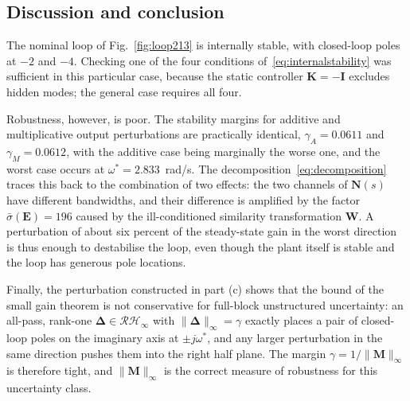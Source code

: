\subsection{Discussion and conclusion}

The nominal loop of Fig.~\ref{fig:loop213} is internally stable, with closed-loop poles at $-2$
and $-4$. Checking one of the four conditions of~\eqref{eq:internalstability} was sufficient in
this particular case, because the static controller $\mathbf{K}=-\mathbf{I}$ excludes hidden
modes; the general case requires all four.

Robustness, however, is poor. The stability margins for additive and multiplicative output
perturbations are practically identical, $\gamma_A=0.0611$ and $\gamma_M=0.0612$, with the
additive case being marginally the worse one, and the worst case occurs at
$\omega^*=2.833$~rad/s. The decomposition~\eqref{eq:decomposition} traces this back to the
combination of two effects: the two channels of $\mathbf{N}(s)$ have different bandwidths, and
their difference is amplified by the factor $\bar{\sigma}(\mathbf{E})=196$ caused by the
ill-conditioned similarity transformation $\mathbf{W}$. A perturbation of about six percent of
the steady-state gain in the worst direction is thus enough to destabilise the loop, even though
the plant itself is stable and the loop has generous pole locations.

Finally, the perturbation constructed in part (c) shows that the bound of the small gain theorem
is not conservative for full-block unstructured uncertainty: an all-pass, rank-one
$\boldsymbol{\Delta}\in\mathcal{RH}_\infty$ with $\|\boldsymbol{\Delta}\|_\infty=\gamma$ exactly
places a pair of closed-loop poles on the imaginary axis at $\pm j\omega^*$, and any larger
perturbation in the same direction pushes them into the right half plane. The margin
$\gamma=1/\|\mathbf{M}\|_\infty$ is therefore tight, and $\|\mathbf{M}\|_\infty$ is the correct
measure of robustness for this uncertainty class.
